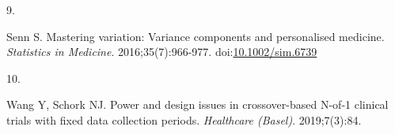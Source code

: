 \documentclass[
  11pt,
]{article}
\newlength{\cslhangindent}
\newlength{\csllabelwidth}
\newenvironment{CSLReferences}[2] %
 {\begin{list}{}{%
  \setlength{\itemindent}{0pt}
  \setlength{\leftmargin}{0pt}
  \setlength{\parsep}{0pt}
  \ifodd #1
   \setlength{\leftmargin}{\cslhangindent}
   \setlength{\itemindent}{-1\cslhangindent}
  \fi
  \setlength{\itemsep}{#2\baselineskip}}}
 {\end{list}}
\newcommand{\CSLLeftMargin}[1]{\parbox[t]{\csllabelwidth}{\strut#1\strut}}
\newcommand{\CSLRightInline}[1]{\parbox[t]{\linewidth - \csllabelwidth}{\strut#1\strut}}
\begin{document}
\begin{CSLReferences}{0}{1}
\CSLLeftMargin{9. }%
\CSLRightInline{Senn S. Mastering variation: Variance components and personalised medicine. \emph{Statistics in Medicine}. 2016;35(7):966-977. doi:\href{https://doi.org/10.1002/sim.6739}{10.1002/sim.6739}}

\CSLLeftMargin{10. }%
\CSLRightInline{Wang Y, Schork NJ. Power and design issues in crossover-based {N}-of-1 clinical trials with fixed data collection periods. \emph{Healthcare (Basel)}. 2019;7(3):84.}

\end{CSLReferences}
\end{document}
